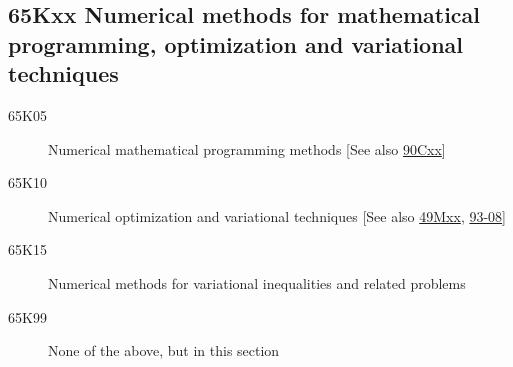 \documentclass[letterpaper]{article}
\begin{document}
\subsection*{65Kxx Numerical methods for mathematical programming, optimization and variational techniques}\label{65Kxx}
\begin{description}  
\item [65K05]\label{65K05} Numerical mathematical programming methods [See also \hyperref[90Cxx]{90Cxx}]
\item [65K10]\label{65K10} Numerical optimization and variational techniques [See also \hyperref[49Mxx]{49Mxx}, \hyperref[93-08]{93-08}]
\item [65K15]\label{65K15} Numerical methods for variational inequalities and related problems
\item [65K99]\label{65K99} None of the above, but in this section
\end{description}
\end{document}

